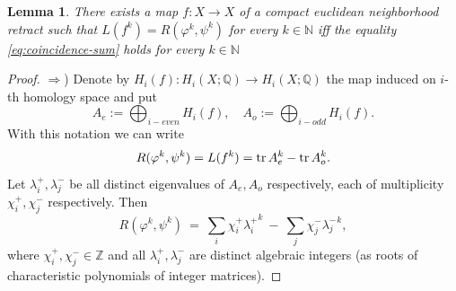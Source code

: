 \documentclass[12pt, a4paper]{amsart}
\def\Z{{\mathbb Z}}
\def\Q{{\mathbb Q}}
\def\tr{\mathop{\rm tr}\nolimits}
\newtheorem{lemma}[theorem]{Lemma}
\def\N{{\mathbb N}}
\begin{document}
\begin{lemma}\label{thm:coefficients-sum-map-bouquet}
  There exists a map $f: X \to X$ of a compact euclidean neighborhood retract such that
  $L(f^k) = R(\varphi^k, \psi^k)$ for every $k \in \N$ iff
  the equality \rm{\eqref{eq:coincidence-sum}} holds for every $k \in \N$
\end{lemma}
\begin{proof}
  $\Rightarrow$)
  Denote by $H_i(f): H_i(X;\Q) \to H_i(X;\Q)$ the map induced on $i$-th homology space and put
  \[
    A_e := \bigoplus_{i-even} H_i(f), \quad A_o := \bigoplus_{i-odd} H_i(f).
  \]
  With this notation we can write
  \[
    R(\varphi^k, \psi^k) = L(f^k) = \tr A_e^k - \tr A_o^k.
  \]
  Let $\lambda_i^+, \lambda_j^-$ be all distinct eigenvalues of $A_e, A_o$ respectively,
  each of multiplicity $\chi_i^+, \chi_j^-$ respectively.
  Then
  \[
    R(\varphi^k, \psi^k) \ = \ \sum_{i} \chi_i^+ {\lambda_i^+}^k \ - \ \sum_j \chi_j^- {\lambda_j^-}^k,
  \]
  where $\chi_i^+, \chi_j^- \in \Z$ and all $\lambda_i^+, \lambda_j^-$ are distinct algebraic integers
  (as roots of characteristic polynomials of integer matrices).



\end{proof}
\end{document}

